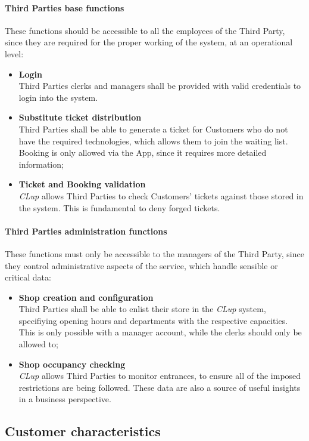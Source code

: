 \paragraph{Third Parties base functions}
These functions should be accessible to all the employees of the Third Party, since they are required for the proper working of the system, at an operational level:
\begin{itemize}
    \item\textbf{Login}\\
          Third Parties clerks and managers shall be provided with valid credentials to login into the system.
    \item\textbf{Substitute ticket distribution}\\
          Third Parties shall be able to generate a ticket for Customers who do not have the required technologies, which allows them to join the waiting list. Booking is only allowed via the App, since it requires more detailed information;
    \item \textbf{Ticket and Booking validation}\\
          \emph{CLup} allows Third Parties to check Customers' tickets against those stored in the system. This is fundamental to deny forged tickets.
\end{itemize}
\paragraph{Third Parties administration functions}
These functions must only be accessible to the managers of the Third Party, since they control administrative aspects of the service, which handle sensible or critical data:
\begin{itemize}
    \item\textbf{Shop creation and configuration}\\
          Third Parties shall be able to enlist their store in the \emph{CLup} system, specifiying opening hours and departments with the respective capacities. This is only possible with a manager account, while the clerks should only be allowed to;
    \item\textbf{Shop occupancy checking}\\
          \emph{CLup} allows Third Parties to monitor entrances, to ensure all of the imposed restrictions are being followed. These data are also a source of useful insights in a business perspective.
\end{itemize}
\subsection{Customer characteristics}

